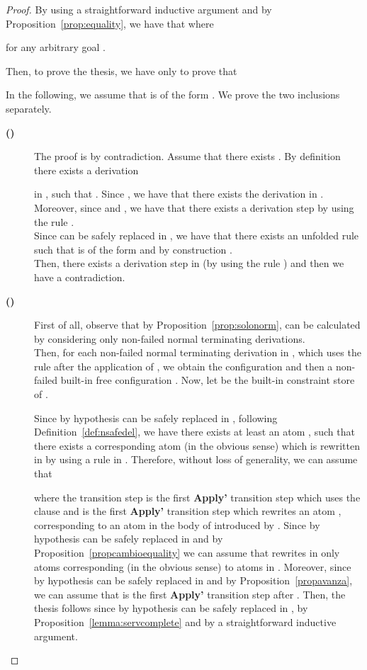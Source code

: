 \documentclass{tlp}
\begin{document}
\begin{proof}
By using a straightforward inductive argument and by
Proposition~\ref{prop:equality}, we have that
 where
 
for any arbitrary goal .

Then, to prove the thesis, we have only to prove that

In the following, we assume that  is of the form .
We prove the two inclusions separately.
\begin{description}
  \item[{\bf () }]
  The proof is by contradiction. Assume that there exists . By definition there exists a derivation
  
in , such that . Since , we have that there exists the derivation
 in . Moreover, since  and , we have that there exists a derivation step  by using the rule . \\
Since  can be safely replaced
in , we have that there exists an unfolded rule  such that  is of the form 
 and by construction . \\
Then, there exists a derivation step  in  (by using the rule ) and then we have a contradiction.


  \item[{\bf () }]
  First of all, observe that by Proposition~\ref{prop:solonorm},
   can be calculated by
considering only non-failed normal terminating derivations. \\
Then, for each non-failed normal terminating derivation  in , which uses the rule  after the application of , we obtain the configuration  and then a non-failed built-in free configuration . Now, let  be the built-in constraint store of .

Since by hypothesis
 can be safely replaced
in , following Definition~\ref{def:nsafedel}, we have there exists at least an atom
, such that there exists a corresponding atom (in the obvious sense)  which is rewritten in  by using a rule  in . Therefore, without loss of generality, we can assume that


 where the transition step  is the first {\bf Apply'} transition step which uses the clause  and  is the first {\bf Apply'} transition step which rewrites an atom , corresponding to an atom  in the body of  introduced by .
 Since by hypothesis
 can be safely replaced
in  and by Proposition~\ref{propcambioequality} we can assume that  rewrites in  only atoms corresponding (in the obvious sense) to atoms in . Moreover, since by hypothesis
 can be safely replaced
in  and by Proposition~\ref{propavanza}, we can assume that  is the first {\bf Apply'} transition step after .
Then, the thesis follows since by hypothesis
 can be safely replaced
in , by Proposition~\ref{lemma:servcomplete} and by a straightforward inductive argument.


\end{description}
\end{proof}
\end{document}
